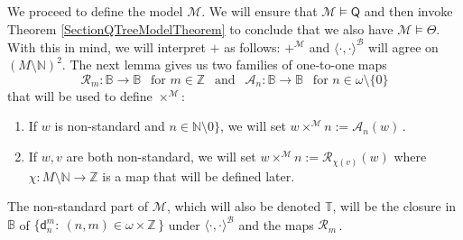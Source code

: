 \documentclass[10pt,a4paper, openany,  oldfontcommands]{memoir}
\newtheorem{open problem} [theorem] {Open Problem}
\newtheorem{open question} [theorem] {Open Question}
\begin{document}
We proceed to define the model  $  \mathcal{M} $. 
We will ensure  that  $  \mathcal{M}  \models  \mathsf{Q} $ and then invoke  Theorem  \ref{SectionQTreeModelTheorem}   to conclude  that we also have 
$     \mathcal{M}   \models  \Theta  $. 
With this in mind,  we will interpret $+$   as follows: 
 $   +^{  \mathcal{M}  }      $   and  $  \langle  \cdot  ,  \cdot   \rangle^{  \mathcal{B}  }     $  
 will agree on  $    \left(   M \setminus \mathbb{N}   \right)^2     $. 
The next lemma gives us two families  of  one-to-one maps 
\[
 \mathcal{R}_m :   \mathbb{B} \to    \mathbb{B}         \    \       \mbox{ for }    m  \in \mathbb{Z}  
\   \    \mbox{  and  }     \      \   
 \mathcal{A}_n :   \mathbb{B} \to    \mathbb{B}         \    \    \mbox{ for }     n  \in  \omega  \setminus  \lbrace 0   \rbrace  
\]
that will be used to define $  \times^{  \mathcal{M}  }  $: 
\begin{enumerate}
\item   If  $  w  $  is non-standard and  $  n  \in  \mathbb{N} \setminus 0  \rbrace  $, 
we will set  $   w    \times^{  \mathcal{M}  }   n  :=      \mathcal{A}_n   \left(  w  \right)      \,    $.


\item  If  $  w, v  $  are both non-standard,  we will set   
 $   w    \times^{  \mathcal{M}  }   n  :=      \mathcal{R}_{  \chi \left(  v  \right)  }    \left(  w  \right)       $
 where  $  \chi :  M  \setminus  \mathbb{N}   \to   \mathbb{Z} $  is a  map that will be defined  later. 
\end{enumerate}
The non-standard part of  $  \mathcal{M} $, which will also  be denoted  $  \mathbb{T} $, 
  will be the closure in   $   \mathbb{B}   $  
of  $  \big\{  \mathsf{d}^m_n  :   \   (n, m  )  \in  \omega  \times  \mathbb{Z}  \,   \big\}  $  under 
$  \langle  \cdot  ,  \cdot  \rangle^{  \mathcal{B}  }        $
and the maps    $   \mathcal{R}_m      \,   $.
\end{document}

